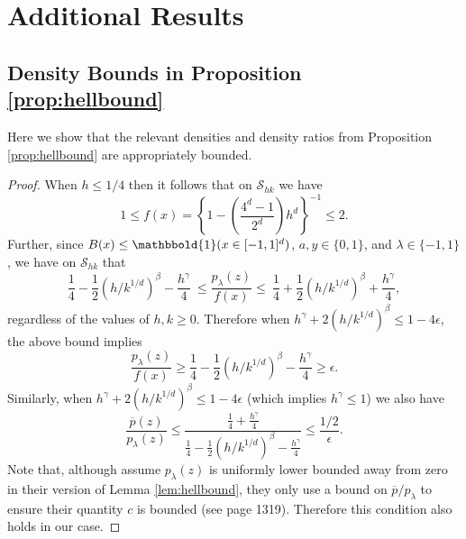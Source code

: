 \documentclass[11pt,twoside]{article}
\newcommand{\one}{\mathbbold{1}}
\theoremstyle{definition}
\theoremstyle{remark}
\begin{document}
\section{Additional Results}
\label{sec:propproofs}


\subsection{Density Bounds in Proposition \ref{prop:hellbound}}
\label{app:prophellbound}

Here we show that the relevant densities and density ratios from Proposition \ref{prop:hellbound} are appropriately bounded. \\

\begin{proof} 
When $h \leq 1/4$ then it follows that on $\mathcal{S}_{hk}$ we have
\begin{equation}
1 \leq f(x) = \left\{ 1  - \left( \frac{4^d - 1}{2^d} \right) h^d \right\}^{-1} \leq 2 . \label{eq:fbd}
\end{equation}
Further, since $B(x) \leq \one(x \in [-1,1]^d)$, $a,y \in \{0,1\}$, and $\lambda \in \{-1,1\}$, we have on $\mathcal{S}_{hk}$ that 
\begin{equation*}
\frac{1}{4} - \frac{ 1 }{2} \left( h/k^{1/d} \right)^\beta  - \frac{h^\gamma}{4}   \  \leq \frac{p_\lambda(z)}{f(x)}  \leq  \  \frac{1}{4} + \frac{ 1}{2}  \left( h/k^{1/d} \right)^\beta  + \frac{h^\gamma}{4}   , 
\end{equation*}
regardless of the values of $h,k \geq 0$. Therefore when $h^\gamma + 2(h/k^{1/d})^\beta \leq 1- 4\epsilon$, the above bound implies
\begin{equation}
\frac{p_\lambda(z)}{f(x)}  \geq  \frac{1}{4} - \frac{ 1 }{2}  \left( h/k^{1/d} \right)^\beta - \frac{h^\gamma}{4}  \geq \epsilon . \label{eq:plamfbd}
\end{equation}
Similarly, when $h^\gamma + 2(h/k^{1/d})^\beta \leq 1- 4\epsilon$ (which implies $h^\gamma \leq 1$) we also have
\begin{equation*}
\frac{\overline{p}(z)}{p_\lambda(z)} \leq \frac{\frac{1}{4} + \frac{h^\gamma}{4} }{\frac{1}{4}  - \frac{ 1 }{2}  \left( h/k^{1/d} \right)^\beta - \frac{h^\gamma}{4} } \leq \frac{1/2}{\epsilon}  .
\end{equation*}
Note that, although \citet{robins2009semiparametric} assume $p_\lambda(z)$ is uniformly lower bounded away from zero in their version of Lemma \ref{lem:hellbound}, they only use a bound on $\overline{p}/p_\lambda$ to ensure their quantity $c$ is bounded (see page 1319). Therefore this condition also holds in our case. 
\end{proof}
\end{document}
